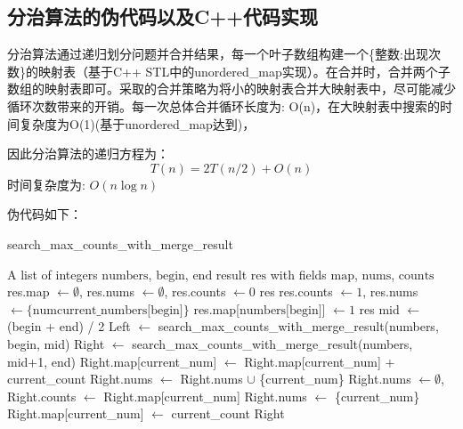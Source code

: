 \documentclass[UTF8,12pt,a4paper]{ctexart}
\begin{document}
\subsection{分治算法的伪代码以及C++代码实现}
分治算法通过递归划分问题并合并结果，每一个叶子数组构建一个\{整数:出现次数\}的映射表（基于C++ STL中的unordered\_map实现）。在合并时，合并两个子数组的映射表即可。采取的合并策略为将小的映射表合并大映射表中，尽可能减少循环次数带来的开销。每一次总体合并循环长度为: O(n)，在大映射表中搜索的时间复杂度为O(1)(基于unordered\_map达到)，

因此分治算法的递归方程为：
\begin{equation}
	T(n) = 2T(n/2) + O(n)
\end{equation}
时间复杂度为: $O(n\log{n})$

伪代码如下：
\begin{algorithm}[H]
	\caption{search\_max\_counts\_with\_merge\_result}
	\begin{algorithmic}[1]
	  \Require A list of integers $\text{numbers}$, $\text{begin}$, $\text{end}$
	  \Ensure result $\text{res}$ with fields $\text{map}$, $\text{nums}$, $\text{counts}$
	  \State res.map $\gets \emptyset$, res.nums $\gets \emptyset$, res.counts $\gets 0$
		\State \Return res
		\State res.counts $\gets 1$, res.nums $\gets \{ \text{numcurrent\_numbers[begin]} \}$
		\State res.map[$\text{numbers[begin]}$] $\gets 1$
		\State \Return res
	  \Else
		\State mid $\gets$ (begin + end) / 2
		\State Left $\gets$ search\_max\_counts\_with\_merge\_result(numbers, begin, mid)
		\State Right $\gets$ search\_max\_counts\_with\_merge\_result(numbers, mid+1, end)
		  \State {}
		\EndIf
			\State Right.map[current\_num] $\gets$ Right.map[current\_num] + current\_count
			  \State Right.nums $\gets$ Right.nums $\cup$ \{current\_num\}
			  \State Right.nums $\gets \emptyset$, Right.counts $\gets$ Right.map[current\_num]
			  \State Right.nums $\gets$ \{current\_num\}
			\EndIf
		  \Else
			\State Right.map[current\_num] $\gets$ current\_count
		  \EndIf
		\EndFor
		\State \Return Right
	  \EndIf
	\end{algorithmic}
\end{algorithm}
\end{document}
